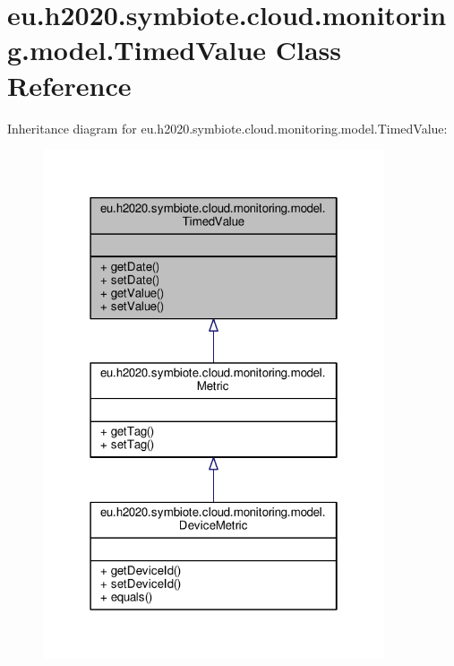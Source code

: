 \hypertarget{classeu_1_1h2020_1_1symbiote_1_1cloud_1_1monitoring_1_1model_1_1TimedValue}{}\section{eu.\+h2020.\+symbiote.\+cloud.\+monitoring.\+model.\+Timed\+Value Class Reference}
\label{classeu_1_1h2020_1_1symbiote_1_1cloud_1_1monitoring_1_1model_1_1TimedValue}


Inheritance diagram for eu.\+h2020.\+symbiote.\+cloud.\+monitoring.\+model.\+Timed\+Value\+:\nopagebreak
\begin{figure}[H]
\begin{center}
\leavevmode
\includegraphics[width=286pt]{classeu_1_1h2020_1_1symbiote_1_1cloud_1_1monitoring_1_1model_1_1TimedValue__inherit__graph}
\end{center}
\end{figure}


